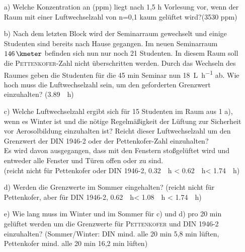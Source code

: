 \begin{enumerate}
	\item [a)] 	Welche Konzentration an  (ppm) liegt nach 1,5 h Vorlesung vor, wenn der Raum mit einer Luftwechselzahl von n=0,1 kaum gelüftet wird?{\scriptsize  (3530 ppm)}
	
	\item [b)] Nach dem letzten Block wird der Seminarraum gewechselt und einige Studenten sind bereits nach Hause gegangen. Im neuen Seminarraum $\SI{146}{\kmeter}$ befinden sich nun nur noch 21 Studenten. In diesem Raum soll die \textsc{Pettenkofer}-Zahl nicht überschritten werden. Durch das Wechseln des Raumes geben die Studenten für die 45 min Seminar nun \SI{18}{\liter \per \hour}   ab. 
	Wie hoch muss die Luftwechselzahl sein, um den geforderten Grenzwert einzuhalten? {\scriptsize (\SI{3,89}{\per \hour})}
	
	\item [c)] Welche Luftwechselzahl ergibt sich für 15 Studenten im Raum aus 1 a), wenn es Winter ist und die nötige Regelmäßigkeit der Lüftung zur Sicherheit vor Aerosolbildung einzuhalten ist? Reicht dieser Luftwechselzahl um den Grenzwert der DIN 1946-2 oder der Pettenkofer-Zahl einzuhalten?\\
	Es wird davon ausgegangen, dass mit den Fenstern stoßgelüftet wird und entweder alle Fenster und Türen offen oder zu sind.\\
	{\scriptsize (reicht nicht für Pettenkofer oder DIN 1946-2, \SI{0,32}{\per \hour} < \SI{0,62}{\per \hour}< \SI{1,74}{\per \hour})}
	
	\item [d)] Werden die Grenzwerte im Sommer eingehalten? 
	{\scriptsize (reicht nicht für Pettenkofer, aber für DIN 1946-2, \SI{0,62}{\per \hour}< \SI{1,08}{\per \hour} < \SI{1,74}{\per \hour})}
	
	\item [e)] Wie lang muss im Winter und im Sommer für c) und d) pro 20 min gelüftet werden um die Grenzwerte für \textsc{Pettenkofer} und DIN 1946-2 einzuhalten?
	{\scriptsize (Sommer/Winter: DIN mind. alle 20 min 5,8 min lüften, Pettenkofer mind. alle 20 min 16,2 min lüften)}
		
\end{enumerate}